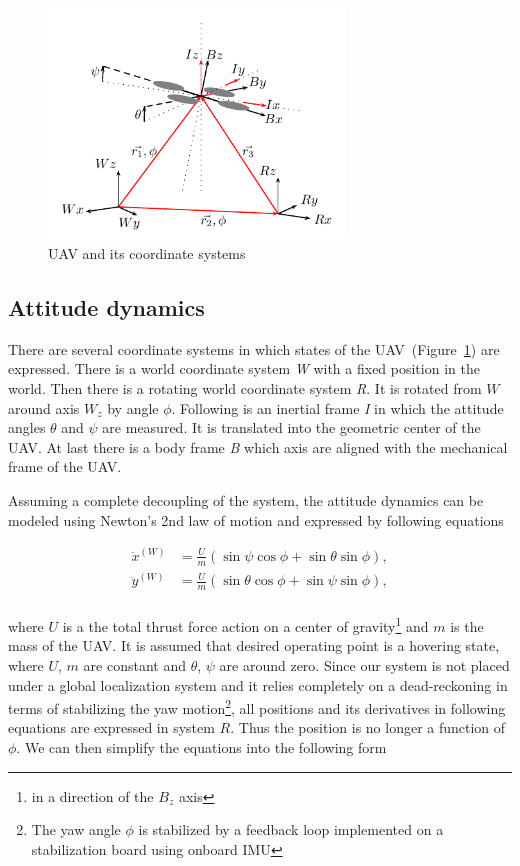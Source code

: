 \begin{figure}[!h]
\centering
\includegraphics[width=0.7\textwidth]{fig/coordinate_system.pdf}
\caption{UAV and its coordinate systems}
\label{fig:coordinate_system}
\end{figure}

\subsection{Attitude dynamics}

There are several coordinate systems in which states of the UAV~(Figure~\ref{fig:coordinate_system}) are expressed. There is a world coordinate system \textit{W} with a fixed position in the world. Then there is a rotating world coordinate system \textit{R}. It is rotated from $W$ around axis $W_z$ by angle $\phi$. Following is an inertial frame \textit{I} in which the attitude angles $\theta$ and $\psi$ are measured. It is translated into the geometric center of the UAV. At last there is a body frame \textit{B} which axis are aligned with the mechanical frame of the UAV.

Assuming a complete decoupling of the system, the attitude dynamics can be modeled using Newton's 2nd law of motion and expressed by following equations

\begin{equation}
\begin{split}
\ddot{x}^{(W)} &= \frac{U}{m}\left(\sin\psi\cos\phi + \sin\theta\sin\phi\right),\\
\ddot{y}^{(W)} &= \frac{U}{m}\left(\sin\theta\cos\phi + \sin\psi\sin\phi\right),\\
\end{split}
\end{equation}

where $U$ is a the total thrust force action on a center of gravity\footnote{in a direction of the $B_z$ axis} and $m$ is the mass of the UAV. It is assumed that desired operating point is a hovering state, where $U$, $m$ are constant and $\theta$, $\psi$ are around zero. Since our system is not placed under a global localization system and it relies completely on a dead-reckoning in terms of stabilizing the yaw motion\footnote{The yaw angle $\phi$ is stabilized by a feedback loop implemented on a stabilization board using onboard IMU}, all positions and its derivatives in following equations are expressed in system $R$. Thus the position is no longer a function of $\phi$. We can then simplify the equations into the following form

